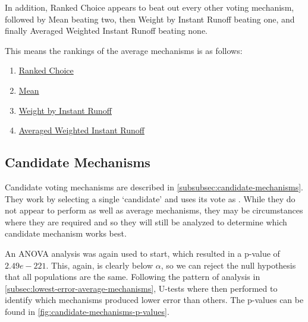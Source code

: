 In addition, Ranked Choice appears to beat out every other voting mechanism, followed
by Mean beating two, then Weight by Instant Runoff beating one, and finally Averaged
Weighted Instant Runoff beating none.
\begin{samepage}
    This means the rankings of the average mechanisms is as follows:
    \begin{enumerate}
        \item \hyperref[para:avg-ranked-choice]{Ranked Choice}
        \item \hyperref[para:mean]{Mean}
        \item \hyperref[para:avg-instant-runoff]{Weight by Instant Runoff}
        \item \hyperref[para:avg-weighted-instant-runoff]{Averaged Weighted Instant
        Runoff}
    \end{enumerate}
\end{samepage}

\subsection{Candidate Mechanisms}\label{subsec:lowest-error-candidate-mechanisms}
Candidate voting mechanisms are described in \autoref{subsubsec:candidate-mechanisms}.
They work by selecting a single `candidate' and uses its vote as \systemtruth.
While they do not appear to perform as well as average mechanisms, they may be
circumstances where they are required and so they will still be analyzed to determine
which candidate mechanism works best.

An ANOVA analysis was again used to start, which resulted in a p-value of
$2.49e-221$.
This, again, is clearly below $\alpha$, so we can reject the null hypothesis that all
populations are the same.
Following the pattern of analysis in
\autoref{subsec:lowest-error-average-mechanisms}, U-tests where then performed to
identify which mechanisms produced lower error than others.
The p-values can be found in \autoref{fig:candidate-mechanisms-p-values}.

